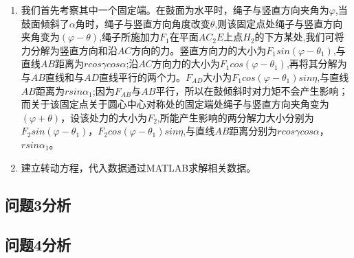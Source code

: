 \documentclass{cumcm}
\begin{document}
\begin{enumerate}
\item 我们首先考察其中一个固定端。在鼓面为水平时，绳子与竖直方向夹角为$\varphi$,当鼓面倾斜了$\alpha$角时，绳子与竖直方向角度改变$\theta$,则该固定点处绳子与竖直方向夹角变为$(\varphi-\theta)$,绳子所施加力$F_1$在平面$AC_2E$上点$H_2$的下方某处,我们可将力分解为竖直方向和沿$AC$方向的力。竖直方向力的大小为$F_1sin(\varphi-\theta_1)$,与直线$AB$距离为$rcos\gamma cos\alpha$;沿$AC$方向力的大小为$F_1cos(\varphi-\theta_1)$,再将其分解为与$AB$直线和与$AD$直线平行的两个力。$F_{AD}$大小为$F_1cos(\varphi-\theta_1)sin\eta$,与直线$AB$距离为$rsin\alpha_1$;因为$F_{AB}$与$AB$平行，所以在鼓倾斜时对力矩不会产生影响；而关于该固定点关于圆心中心对称处的固定端处绳子与竖直方向夹角变为$(\varphi+\theta)$，设该处力的大小为$F_2$,所能产生影响的两分解力大小分别为$F_2sin(\varphi-\theta_1)$，$F_2cos(\varphi-\theta_1)sin\eta$,与直线$AB$距离分别为$rcos\gamma cos\alpha$，$rsin\alpha_1$。
\item 建立转动方程，代入数据通过MATLAB求解相关数据。
\end{enumerate}
\subsection{问题3分析}
\subsection{问题4分析}
\end{document}
